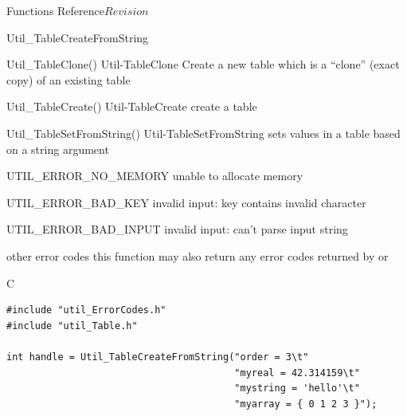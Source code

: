 \begin{cactuspart}{ Functions Reference}{}{$Revision$}
\begin{FunctionDescription}{Util\_TableCreateFromString}
\begin{SeeAlsoSection}
\begin{SeeAlso2} {Util\_TableClone()} {Util-TableClone}
Create a new table which is a ``clone'' (exact copy) of an existing
table
\end{SeeAlso2}
\begin{SeeAlso2} {Util\_TableCreate()} {Util-TableCreate}
create a table
\end{SeeAlso2}
\begin{SeeAlso2} {Util\_TableSetFromString()} {Util-TableSetFromString}
sets values in a table based on a string argument
\end{SeeAlso2}
\end{SeeAlsoSection}

\begin{ErrorSection}
\begin{Error}{UTIL\_ERROR\_NO\_MEMORY}
unable to allocate memory
\end{Error}
\begin{Error}{UTIL\_ERROR\_BAD\_KEY}
invalid input: key contains invalid character
\end{Error}
\begin{Error}{UTIL\_ERROR\_BAD\_INPUT}
invalid input: can't parse input string
\end{Error}
\begin{Error}{\rm other error codes}
this function may also return any error codes returned by
 or 
\end{Error}
\end{ErrorSection}

\begin{ExampleSection}
\begin{Example}{C}
\begin{verbatim}
#include "util_ErrorCodes.h"
#include "util_Table.h"

int handle = Util_TableCreateFromString("order = 3\t"
                                        "myreal = 42.314159\t"
                                        "mystring = 'hello'\t"
                                        "myarray = { 0 1 2 3 }");


\end{verbatim}
\end{Example}
\end{ExampleSection}
\end{FunctionDescription}
\end{cactuspart}
